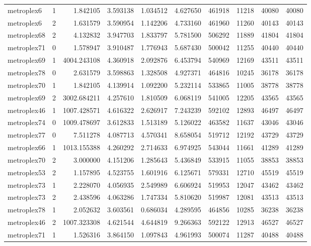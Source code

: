 \begin{longtable}{|l|r|r|r|r|r|r|r|r|r|}
metroplex6 & 1 & 1.842105 & 3.593138 & 1.034512 & 4.627650 & 461918 & 11218 & 40080 & 40080 \\
metroplex6 & 2 & 1.631579 & 3.590954 & 1.142206 & 4.733160 & 461960 & 11260 & 40143 & 40143 \\
metroplex68 & 2 & 4.132832 & 3.947703 & 1.833797 & 5.781500 & 506292 & 11889 & 41804 & 41804 \\
metroplex71 & 0 & 1.578947 & 3.910487 & 1.776943 & 5.687430 & 500042 & 11255 & 40440 & 40440 \\
metroplex69 & 1 & 4004.243108 & 4.360918 & 2.092876 & 6.453794 & 540969 & 12169 & 43511 & 43511 \\
metroplex78 & 0 & 2.631579 & 3.598863 & 1.328508 & 4.927371 & 464816 & 10245 & 36178 & 36178 \\
metroplex70 & 1 & 1.842105 & 4.139914 & 1.092200 & 5.232114 & 533865 & 11005 & 38778 & 38778 \\
metroplex69 & 2 & 3002.684211 & 4.257610 & 1.810509 & 6.068119 & 541005 & 12205 & 43565 & 43565 \\
metroplex46 & 1 & 1007.428571 & 4.616322 & 2.626917 & 7.243239 & 592102 & 12893 & 46497 & 46497 \\
metroplex74 & 0 & 1009.478697 & 3.612833 & 1.513189 & 5.126022 & 463582 & 11637 & 43046 & 43046 \\
metroplex77 & 0 & 7.511278 & 4.087713 & 4.570341 & 8.658054 & 519712 & 12192 & 43729 & 43729 \\
metroplex66 & 1 & 1013.155388 & 4.260292 & 2.714633 & 6.974925 & 543044 & 11661 & 41289 & 41289 \\
metroplex70 & 2 & 3.000000 & 4.151206 & 1.285643 & 5.436849 & 533915 & 11055 & 38853 & 38853 \\
metroplex53 & 2 & 1.157895 & 4.523755 & 1.601916 & 6.125671 & 579331 & 12710 & 45519 & 45519 \\
metroplex73 & 1 & 2.228070 & 4.056935 & 2.549989 & 6.606924 & 519953 & 12047 & 43462 & 43462 \\
metroplex73 & 2 & 2.438596 & 4.063286 & 1.747334 & 5.810620 & 519987 & 12081 & 43513 & 43513 \\
metroplex78 & 1 & 2.052632 & 3.603561 & 0.686034 & 4.289595 & 464856 & 10285 & 36238 & 36238 \\
metroplex46 & 2 & 1007.323308 & 4.621544 & 4.644819 & 9.266363 & 592122 & 12913 & 46527 & 46527 \\
metroplex71 & 1 & 1.526316 & 3.864150 & 1.097843 & 4.961993 & 500074 & 11287 & 40488 & 40488 \\

\end{longtable}
